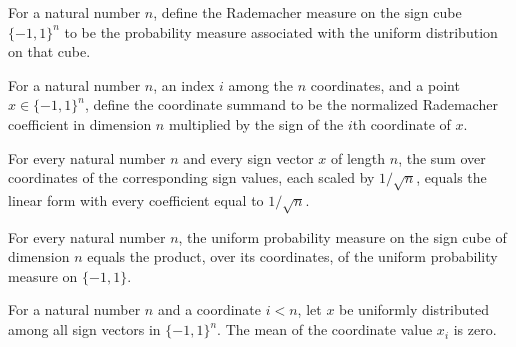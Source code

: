 \begin{definition}
\label{FABL.hammingBallRademacherMeasure}
\leanok
{}
For a natural number $n$, define the Rademacher measure on the sign cube $\{-1,1\}^n$
to be the probability measure associated with the uniform distribution on that cube.
\end{definition}

\begin{definition}
\label{FABL.hammingBallRademacherSummand}
\leanok
{}
For a natural number $n$, an index $i$ among the $n$ coordinates, and a point
$x\in\{-1,1\}^n$, define the coordinate summand to be the normalized Rademacher
coefficient in dimension $n$ multiplied by the sign of the $i$th coordinate of $x$.
\end{definition}

\begin{theorem}
\label{FABL.sum_hammingBallRademacherSummand}
\leanok
{}
For every natural number $n$ and every sign vector $x$ of length $n$, the sum over
coordinates of the corresponding sign values, each scaled by $1/\sqrt n$, equals the
linear form with every coefficient equal to $1/\sqrt n$.
\end{theorem}

\begin{theorem}
\label{FABL.hammingBallRademacherMeasure_eq_pi}
\leanok
{}
For every natural number $n$, the uniform probability measure on the sign cube of
dimension $n$ equals the product, over its coordinates, of the uniform probability
measure on $\{−1,1\}$.
\end{theorem}

\begin{theorem}
\label{FABL.integral_hammingBallSignCoordinate_eq_zero}
\leanok
{}
For a natural number $n$ and a coordinate $i<n$, let $x$ be uniformly distributed among
all sign vectors in $\{-1,1\}^n$. The mean of the coordinate value $x_i$ is zero.
\end{theorem}


